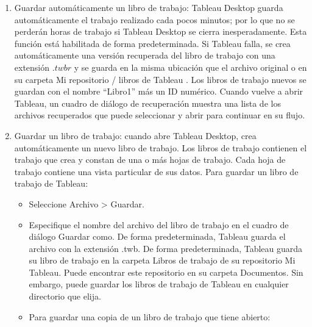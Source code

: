\documentclass[
]{book}
\providecommand{\tightlist}{%
  \setlength{\itemsep}{0pt}\setlength{\parskip}{0pt}}
\begin{document}
\begin{enumerate}
\def\labelenumi{\arabic{enumi}.}
\item
  Guardar automáticamente un libro de trabajo: Tableau Desktop guarda automáticamente el trabajo realizado cada pocos minutos; por lo que no se perderán horas de trabajo si Tableau Desktop se cierra inesperadamente. Esta función está habilitada de forma predeterminada.
  Si Tableau falla, se crea automáticamente una versión recuperada del libro de trabajo con una extensión \(.twbr\) y se guarda en la misma ubicación que el archivo original o en su carpeta Mi repositorio / libros de Tableau . Los libros de trabajo nuevos se guardan con el nombre ``Libro1'' más un ID numérico. Cuando vuelve a abrir Tableau, un cuadro de diálogo de recuperación muestra una lista de los archivos recuperados que puede seleccionar y abrir para continuar en su flujo.
\item
  Guardar un libro de trabajo: cuando abre Tableau Desktop, crea automáticamente un nuevo libro de trabajo. Los libros de trabajo contienen el trabajo que crea y constan de una o más hojas de trabajo. Cada hoja de trabajo contiene una vista particular de sus datos. Para guardar un libro de trabajo de Tableau:

  \begin{itemize}
  \tightlist
  \item
    Seleccione Archivo \textgreater{} Guardar.
  \item
    Especifique el nombre del archivo del libro de trabajo en el cuadro de
    diálogo Guardar como.
    De forma predeterminada, Tableau guarda el archivo con la extensión .twb.
    De forma predeterminada, Tableau guarda su libro de trabajo en la carpeta
    Libros de trabajo de su repositorio Mi Tableau. Puede encontrar este
    repositorio en su carpeta Documentos. Sin embargo, puede guardar los
    libros de trabajo de Tableau en cualquier directorio que elija.
  \item
    Para guardar una copia de un libro de trabajo que tiene abierto:


\end{itemize}
\end{enumerate}
\end{document}
